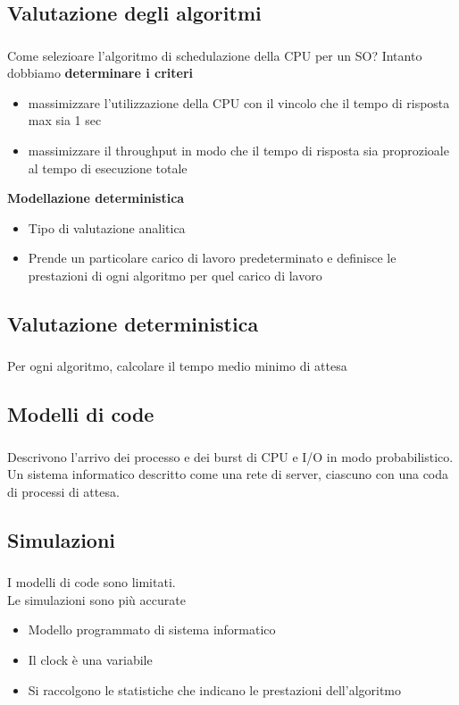 \documentclass{beamer}
\newenvironment{mainframe}{
	\begin{frame}
		\frametitle{\insertsubsection}
		\framesubtitle{\insertsection}
	}{
	\end{frame}
}
\begin{document}
\subsection{Valutazione degli algoritmi}
\begin{mainframe}
	Come selezioare l'algoritmo di schedulazione della CPU per un SO? Intanto dobbiamo \textbf{determinare i criteri}
	\begin{itemize}
		\item massimizzare l'utilizzazione della CPU con il vincolo che il tempo di risposta max sia 1 sec
		\item massimizzare il throughput in modo che il tempo di risposta sia proprozioale al tempo di esecuzione totale
	\end{itemize}
	\textbf{Modellazione deterministica}
	\begin{itemize}
		\item Tipo di valutazione analitica
		\item Prende un particolare carico di lavoro predeterminato e definisce le prestazioni di ogni algoritmo per quel carico di lavoro
	\end{itemize}
\end{mainframe}
\subsection{Valutazione deterministica}
\begin{mainframe}
	Per ogni algoritmo, calcolare il tempo medio minimo di attesa
\end{mainframe}
\subsection{Modelli di code}
\begin{mainframe}
	Descrivono l'arrivo dei processo e dei burst di CPU e I/O in modo probabilistico.\\
	Un sistema informatico descritto come una rete di server, ciascuno con una coda di processi di attesa.
\end{mainframe}
\subsection{Simulazioni}
\begin{mainframe}
	I modelli di code sono limitati.\\
	Le simulazioni sono più accurate
	\begin{itemize}
		\item Modello programmato di sistema informatico
		\item Il clock è una variabile
		\item Si raccolgono le statistiche che indicano le prestazioni dell'algoritmo
	\end{itemize}
\end{mainframe}
\end{document}
